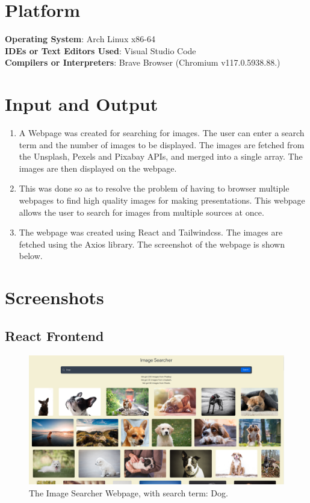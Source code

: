 \documentclass[11pt]{article}
\begin{document}
\section{Platform}
\textbf{Operating System}: Arch Linux x86-64 \\
\textbf{IDEs or Text Editors Used}: Visual Studio Code\\
\textbf{Compilers or Interpreters}: Brave Browser (Chromium v117.0.5938.88.) \\

\section{Input and Output}

\begin{enumerate}
    \item A Webpage was created for searching for images. The user can enter a search term and the number of images to be displayed. The images are fetched from the Unsplash, Pexels and Pixabay APIs, and merged into a single array. The images are then displayed on the webpage.
    \item This was done so as to resolve the problem of having to browser multiple webpages to find high quality images for making presentations. This webpage allows the user to search for images from multiple sources at once.
    \item The webpage was created using React and Tailwindcss. The images are fetched using the Axios library. The screenshot of the webpage is shown below.
\end{enumerate}

\section{Screenshots}

\subsection{React Frontend}
\begin{figure}[H]
    \centering
    \includegraphics[width=.95\textwidth]{ss.png}
    \caption{The Image Searcher Webpage, with search term: Dog. }
\end{figure}
\end{document}

